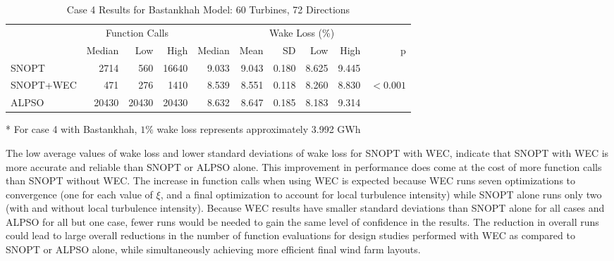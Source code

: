 \documentclass{jpconf}
\begin{document}
\begin{table}
	\centering
	\caption{Case 4 Results for Bastankhah Model: 60 Turbines, 72 Directions}
	\label{tab:case4}
	\begin{threeparttable}
	\begin{tabular}{lrrrrrrrrr}
		\toprule
		{} & \multicolumn{3}{c}{Function Calls} & \multicolumn{6}{c}{Wake Loss (\%)\tnote{*}} \\
		\cmidrule(lr){2-4} \cmidrule(lr){5-10}
		{} &         Median &    Low &   High &        Median &  Mean &    SD &   Low &  High &          p \\
		\cmidrule(lr){2-4} \cmidrule(lr){5-10}
		SNOPT     &           2714 &    560 &  16640 &         9.033 & 9.043 & 0.180 & 8.625 & 9.445 &            \\
		SNOPT+WEC &            471 &    276 &   1410 &         8.539 & 8.551 & 0.118 & 8.260 & 8.830 &  $< 0.001$ \\
		ALPSO     &          20430 &  20430 &  20430 &         8.632 & 8.647 & 0.185 & 8.183 & 9.314 &            \\
		\bottomrule
	\end{tabular}
	\begin{tablenotes}
		\item[*] For case 4 with Bastankhah, $1\%$ wake loss represents approximately 3.992 GWh
	\end{tablenotes}
	\end{threeparttable}
\end{table}

The low average values of wake loss and lower standard deviations of wake loss for SNOPT with WEC, indicate that SNOPT with WEC is more accurate and reliable than SNOPT or ALPSO alone. This improvement in performance does come at the cost of more function calls than SNOPT without WEC. The increase in function calls when using WEC is expected because WEC runs seven optimizations to convergence (one for each value of $\xi$, and a final optimization to account for local turbulence intensity) while SNOPT alone runs only two (with and without local turbulence intensity). Because WEC results have smaller standard deviations than SNOPT alone for all cases and ALPSO for all but one case, fewer runs would be needed to gain the same level of confidence in the results. The reduction in overall runs could lead to large overall reductions in the number of function evaluations for design studies performed with WEC as compared to SNOPT or ALPSO alone, while simultaneously achieving more efficient final wind farm layouts.
\end{document}
